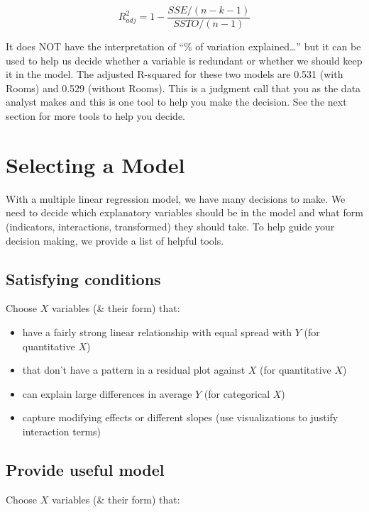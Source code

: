 \documentclass[
]{book}
\providecommand{\tightlist}{%
  \setlength{\itemsep}{0pt}\setlength{\parskip}{0pt}}
\begin{document}
\[R^2_{adj} = 1 - \frac{SSE/(n-k-1)}{SSTO/(n-1)}\]

It does NOT have the interpretation of ``\% of variation explained\ldots{}'' but it can be used to help us decide whether a variable is redundant or whether we should keep it in the model. The adjusted R-squared for these two models are 0.531 (with Rooms) and 0.529 (without Rooms). This is a judgment call that you as the data analyst makes and this is one tool to help you make the decision. See the next section for more tools to help you decide.

\hypertarget{selecting-a-model}{%
\section{Selecting a Model}\label{selecting-a-model}}

With a multiple linear regression model, we have many decisions to make. We need to decide which explanatory variables should be in the model and what form (indicators, interactions, transformed) they should take. To help guide your decision making, we provide a list of helpful tools.

\hypertarget{satisfying-conditions}{%
\subsection{Satisfying conditions}\label{satisfying-conditions}}

Choose \(X\) variables (\& their form) that:

\begin{itemize}
\tightlist
\item
  have a fairly strong linear relationship with equal spread with \(Y\) (for quantitative \(X\))
\item
  that don't have a pattern in a residual plot against \(X\) (for quantitative \(X\))
\item
  can explain large differences in average \(Y\) (for categorical \(X\))
\item
  capture modifying effects or different slopes (use visualizations to justify interaction terms)
\end{itemize}

\hypertarget{provide-useful-model}{%
\subsection{Provide useful model}\label{provide-useful-model}}

Choose \(X\) variables (\& their form) that:
\end{document}
